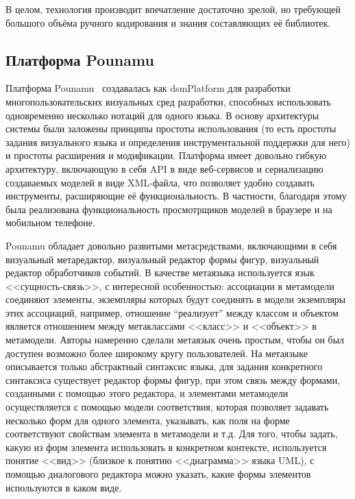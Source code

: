 В целом, технология производит впечатление достаточно зрелой, но требующей большого
объёма ручного кодирования и знания составляющих её библиотек. 

\subsection{Платформа Pounamu}
Платформа Pounamu~\cite{zhu2007pounamu} создавалась как \ac{dsmPlatform} для разработки 
многопользовательских визуальных сред разработки, способных использовать одновременно 
несколько нотаций для одного языка. В основу архитектуры системы были заложены принципы 
простоты использования (то есть простоты задания визуального языка и определения инструментальной 
поддержки для него) и простоты расширения и модификации. Платформа имеет довольно 
гибкую архитектуру, включающую в себя API в виде веб-сервисов и сериализацию создаваемых 
моделей в виде XML-файла, что позволяет удобно создавать инструменты, расширяющие её 
функциональность. В частности, благодаря этому была реализована функциональность просмотрщиков 
моделей в браузере и на мобильном телефоне.

Pounamu обладает довольно развитыми метасредствами, включающими в себя визуальный 
метаредактор, визуальный редактор формы фигур, визуальный редактор обработчиков событий. 
В качестве метаязыка используется язык <<сущность-связь>>, с интересной особенностью: 
ассоциации в метамодели соединяют элементы, экземпляры которых будут соединять в модели 
экземпляры этих ассоциаций, например, отношение “реализует” между классом и объектом 
является отношением между метаклассами <<класс>> и <<объект>> в метамодели. Авторы 
намеренно сделали метаязык очень простым, чтобы он был доступен возможно более широкому 
кругу пользователей. На метаязыке описывается только абстрактный синтаксис языка, для 
задания конкретного синтаксиса существует редактор формы фигур, при этом связь между 
формами, созданными с помощью этого редактора, и элементами метамодели осуществляется 
с помощью модели соответствия, которая позволяет задавать несколько форм для одного 
элемента, указывать, как поля на форме соответствуют свойствам элемента в метамодели 
и т.д. Для того, чтобы задать, какую из форм элемента использовать в конкретном контексте, 
используется понятие <<вид>> (близкое к понятию <<диаграмма>> языка UML), с помощью 
диалогового редактора можно указать, какие формы элементов используются в каком виде.

